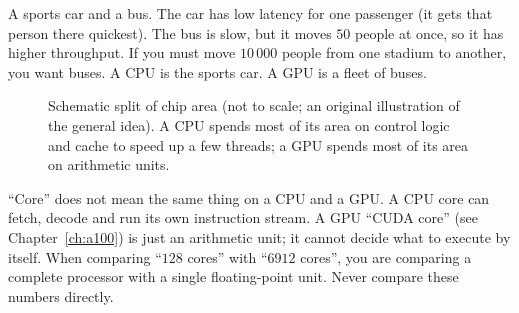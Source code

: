 \begin{intuition}
A sports car and a bus. The car has low latency for one passenger (it gets that person there
quickest). The bus is slow, but it moves $50$ people at once, so it has higher throughput. If you
must move $10\,000$ people from one stadium to another, you want buses. A CPU is the sports
car. A GPU is a fleet of buses.
\end{intuition}

\begin{figure}[ht]
\centering
{}
\caption{Schematic split of chip area (not to scale; an original illustration of the general idea).
A CPU spends most of its area on control logic and cache to speed up a few threads;
a GPU spends most of its area on arithmetic units.}
\label{fig:cpugpu}
\end{figure}

\begin{pitfall}
``Core'' does not mean the same thing on a CPU and a GPU. A CPU core can fetch, decode and run its own instruction stream. A
GPU ``CUDA core'' (see Chapter~\ref{ch:a100}) is just an arithmetic unit; it cannot decide
what to execute by itself. When comparing ``$128$ cores'' with ``$6912$ cores'', you are comparing
a complete processor with a single floating-point unit. Never compare these numbers directly.
\end{pitfall}

